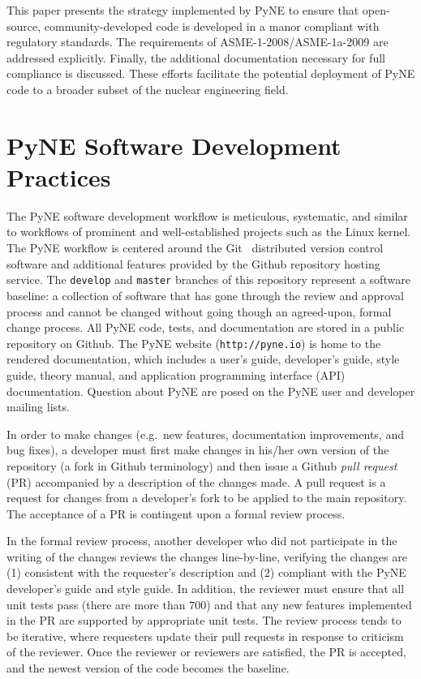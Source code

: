 \documentclass{anstrans}
\begin{document}
This paper presents the strategy implemented by PyNE to ensure that
open-source, community-developed code is developed in a manor compliant with
regulatory standards. The requirements of ASME-1-2008/ASME-1a-2009 are
addressed explicitly. Finally, the additional documentation necessary for full
compliance is discussed. These efforts facilitate the potential deployment of
PyNE code to a broader subset of the nuclear engineering field.

\section{PyNE Software Development Practices}

The PyNE software development workflow is meticulous, systematic, and similar
to workflows of prominent and well-established projects such as the Linux kernel.
The PyNE workflow is centered around the Git~\cite{git_2014} distributed version control software
and additional features provided by the Github repository hosting service.
The \texttt{develop} and \texttt{master} branches of this repository represent
a software baseline: a collection of software that has gone through the review and
approval process and cannot be changed without going though an agreed-upon, formal change process.
All PyNE code, tests, and documentation are stored in a public
repository on Github. The PyNE website (\texttt{http://pyne.io}) is home to the
rendered documentation, which includes a user's guide, developer's guide, style
guide, theory manual, and application programming interface (API) documentation.
Question about PyNE are posed on the PyNE user and developer mailing lists.

In order to make changes (e.g.\ new features, documentation improvements, and
bug fixes), a developer must first make changes in his/her own version of the
repository (a fork in Github terminology) and then issue a Github \emph{pull
request} (PR) accompanied by a description of the changes made. A pull request
is a request for changes from a developer's fork to be applied to the main
repository. The acceptance of a PR is contingent upon a formal review process.

In the formal review process, another developer who did not participate in the writing of the changes
reviews the changes line-by-line, verifying the changes are (1) consistent with
the requester's description and (2) compliant with the PyNE
developer's guide and style guide. In addition, the reviewer must
ensure that all unit tests pass (there are more than 700) and that
any new features implemented in the PR are supported by appropriate unit
tests. The review process tends to be iterative, where requesters update their pull
requests in response to criticism of the reviewer. Once the reviewer or
reviewers are satisfied, the PR is accepted, and the newest version of the
code becomes the baseline.
\end{document}
